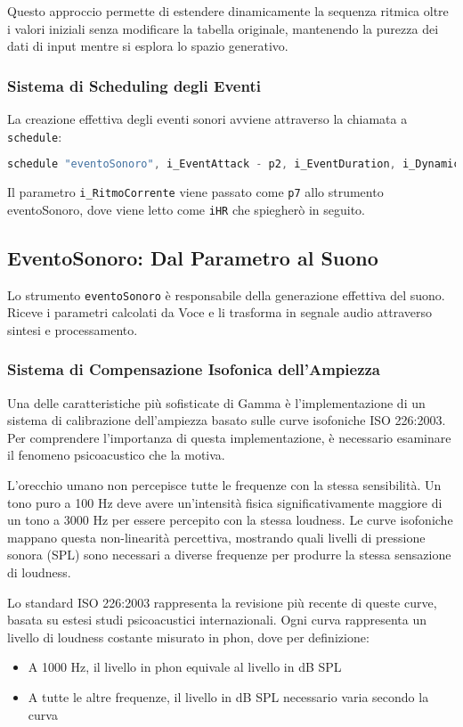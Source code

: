 Questo approccio permette di estendere dinamicamente la sequenza ritmica oltre i valori iniziali senza modificare la tabella originale, mantenendo la purezza dei dati di input mentre si esplora lo spazio generativo.
\subsubsection{Sistema di Scheduling degli Eventi}
La creazione effettiva degli eventi sonori avviene attraverso la chiamata a \texttt{schedule}:

\begin{lstlisting}[language=C]
schedule "eventoSonoro", i_EventAttack - p2, i_EventDuration, i_DynamicIndex, i_Freq1, i_Pos, i_RitmoCorrente, i_Freq2, i_ifnAttacco, gi_Index, i_IdComp, i_SensoMovimento, i_ifn_section_env, i_section_start_time, i_section_duration
\end{lstlisting}

Il parametro \texttt{i\_RitmoCorrente} viene passato come \texttt{p7} allo strumento eventoSonoro, dove viene letto come \texttt{iHR} che spiegherò in seguito.
\subsection{EventoSonoro: Dal Parametro al Suono}
Lo strumento \texttt{eventoSonoro} è responsabile della generazione effettiva del suono. Riceve i parametri calcolati da Voce e li trasforma in segnale audio attraverso sintesi e processamento.
\subsubsection{Sistema di Compensazione Isofonica dell'Ampiezza}
Una delle caratteristiche più sofisticate di Gamma è l'implementazione di un sistema di calibrazione dell'ampiezza basato sulle curve isofoniche ISO 226:2003. Per comprendere l'importanza di questa implementazione, è necessario esaminare il fenomeno psicoacustico che la motiva.

L'orecchio umano non percepisce tutte le frequenze con la stessa sensibilità. Un tono puro a 100 Hz deve avere un'intensità fisica significativamente maggiore di un tono a 3000 Hz per essere percepito con la stessa loudness. Le curve isofoniche mappano questa non-linearità percettiva, mostrando quali livelli di pressione sonora (SPL) sono necessari a diverse frequenze per produrre la stessa sensazione di loudness.

Lo standard ISO 226:2003 rappresenta la revisione più recente di queste curve, basata su estesi studi psicoacustici internazionali. Ogni curva rappresenta un livello di loudness costante misurato in phon, dove per definizione:
\begin{itemize}
    \item A 1000 Hz, il livello in phon equivale al livello in dB SPL
    \item A tutte le altre frequenze, il livello in dB SPL necessario varia secondo la curva
\end{itemize}

